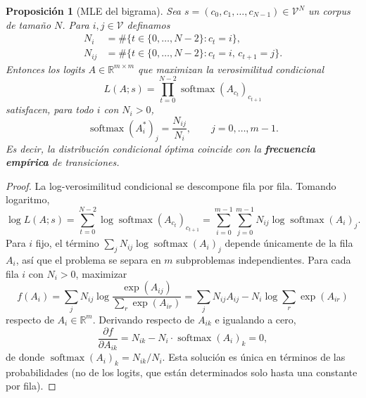 \documentclass[11pt]{report}
\newenvironment{tcolorbox}[1][]{\par\medskip\noindent\ignorespaces}{\par\medskip}
\theoremstyle{definition}
\theoremstyle{plain}
\newtheorem{proposicion}[definicion]{Proposición}
\numberwithin{equation}{section}
\newcommand{\R}{\mathbb{R}}
\newcommand{\V}{\mathcal{V}}
\newcommand{\softmax}{\operatorname{softmax}}
\begin{document}
\begin{tcolorbox}[colback=blue!8, colframe=blue!8, boxrule=0pt]
\begin{proposicion}[MLE del bigrama]
Sea \(s=(c_0,c_1,\ldots,c_{N-1})\in\V^N\) un corpus de tamaño \(N\). Para \(i,j\in\V\) definamos
\begin{align*}
    N_i  &= \#\{t\in\{0,\ldots,N-2\}:c_t=i\},\\
    N_{ij} &= \#\{t\in\{0,\ldots,N-2\}:c_t=i,\,c_{t+1}=j\}.
\end{align*}
Entonces los logits \(A\in\R^{m\times m}\) que maximizan la verosimilitud condicional
\begin{equation*}
    L(A;s) = \prod_{t=0}^{N-2} \softmax(A_{c_t})_{c_{t+1}}
\end{equation*}
satisfacen, para todo \(i\) con \(N_i>0\),
\begin{equation*}
    \softmax(A_i^*)_j = \frac{N_{ij}}{N_i},
    \qquad j=0,\ldots,m-1.
\end{equation*}
Es decir, la distribución condicional óptima coincide con la \textbf{frecuencia empírica} de transiciones.
\end{proposicion}
\end{tcolorbox}

\begin{proof}
La log-verosimilitud condicional se descompone fila por fila. Tomando logaritmo,
\begin{equation*}
    \log L(A;s)
    =
    \sum_{t=0}^{N-2}
    \log\softmax(A_{c_t})_{c_{t+1}}
    =
    \sum_{i=0}^{m-1}\sum_{j=0}^{m-1}
    N_{ij}\log\softmax(A_i)_j.
\end{equation*}
Para \(i\) fijo, el término \(\sum_j N_{ij}\log\softmax(A_i)_j\) depende únicamente de la fila \(A_i\), así que el problema se separa en \(m\) subproblemas independientes. Para cada fila \(i\) con \(N_i>0\), maximizar
\begin{equation*}
    f(A_i)
    =
    \sum_{j} N_{ij}\log\frac{\exp(A_{ij})}{\sum_r \exp(A_{ir})}
    =
    \sum_j N_{ij} A_{ij} - N_i \log\!\sum_r \exp(A_{ir})
\end{equation*}
respecto de \(A_i\in\R^m\). Derivando respecto de \(A_{ik}\) e igualando a cero,
\begin{equation*}
    \frac{\partial f}{\partial A_{ik}}
    =
    N_{ik} - N_i \cdot \softmax(A_i)_k
    = 0,
\end{equation*}
de donde \(\softmax(A_i)_k = N_{ik}/N_i\). Esta solución es única en términos de las probabilidades (no de los logits, que están determinados solo hasta una constante por fila).
\end{proof}
\end{document}
